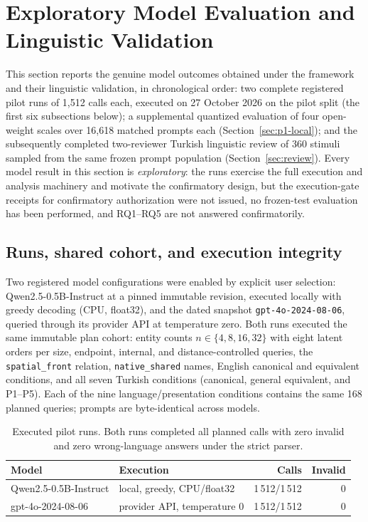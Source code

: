 \section{Exploratory Model Evaluation and Linguistic Validation}
\label{sec:pilot}

This section reports the genuine model outcomes obtained under the framework and their linguistic
validation, in chronological order: two complete registered pilot runs of 1,512 calls each, executed on
27 October 2026 on the pilot split (the first six subsections below); a supplemental quantized evaluation
of four open-weight scales over 16,618 matched prompts each (Section~\ref{sec:p1-local}); and the
subsequently completed two-reviewer Turkish linguistic review of 360 stimuli sampled from the same frozen
prompt population (Section~\ref{sec:review}). Every model result in this section is \emph{exploratory}: the
runs exercise the full execution and analysis machinery and motivate the confirmatory design, but the
execution-gate receipts for confirmatory authorization were not issued, no frozen-test evaluation has been
performed, and RQ1--RQ5 are not answered confirmatorily.

\subsection{Runs, shared cohort, and execution integrity}

Two registered model configurations were enabled by explicit user selection: Qwen2.5-0.5B-Instruct at a
pinned immutable revision, executed locally with greedy decoding (CPU, float32), and the dated snapshot
\texttt{gpt-4o-2024-08-06}, queried through its provider API at temperature zero. Both runs executed the
same immutable plan cohort: entity counts $n \in \{4, 8, 16, 32\}$ with eight latent orders per size,
endpoint, internal, and distance-controlled queries, the \texttt{spatial\_front} relation,
\texttt{native\_shared} names, English canonical and equivalent conditions, and all seven Turkish
conditions (canonical, general equivalent, and P1--P5). Each of the nine language/presentation conditions
contains the same 168 planned queries; prompts are byte-identical across models.

\begin{table}[t]
  \centering
  \caption{Executed pilot runs. Both runs completed all planned calls with zero invalid and zero
  wrong-language answers under the strict parser.}
  \label{tab:pilotruns}
  \small
  \begin{tabular}{@{}llrr@{}}
    \toprule
    Model & Execution & Calls & Invalid \\
    \midrule
    Qwen2.5-0.5B-Instruct & local, greedy, CPU/float32 & 1\,512/1\,512 & 0 \\
    gpt-4o-2024-08-06     & provider API, temperature 0 & 1\,512/1\,512 & 0 \\
    \bottomrule
  \end{tabular}
\end{table}

